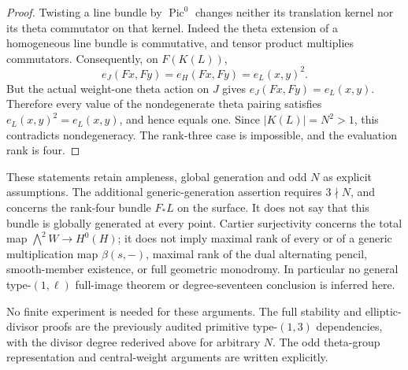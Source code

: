 \begin{proof}
Twisting a line bundle by \(\operatorname{Pic}^0\) changes
neither its translation kernel nor its theta commutator on that
kernel. Indeed the theta extension of a homogeneous line bundle
is commutative, and tensor product multiplies commutators.
Consequently, on \(F(K(L))\),
\[
             e_J(Fx,Fy)=e_H(Fx,Fy)=e_L(x,y)^2.
 \tag{DE-OE9}
\]
But the actual weight-one theta action on \(J\) gives
\(e_J(Fx,Fy)=e_L(x,y)\). Therefore every value of the
nondegenerate theta pairing satisfies \(e_L(x,y)^2=e_L(x,y)\),
and hence equals one. Since \(|K(L)|=N^2>1\), this
contradicts nondegeneracy. The rank-three case is impossible,
and the evaluation rank is four.
\end{proof}

\begin{remark}
\label{rem:DE-odd-Cartier-evaluation-scope}
These statements retain ampleness, global generation and odd
\(N\) as explicit assumptions. The additional generic-generation
assertion requires \(3\nmid N\), and concerns the rank-four
bundle \(F_*L\) on the surface. It does not say that this
bundle is globally generated at every point. Cartier surjectivity
concerns the total map \(\bigwedge^2W\to H^0(H)\); it does
not imply maximal rank of every or of a generic multiplication
map \(\beta(s,-)\), maximal rank of the dual alternating pencil,
smooth-member existence, or full geometric monodromy. In
particular no general type-\((1,\ell)\) full-image theorem or
degree-seventeen conclusion is inferred here.

No finite experiment is needed for these arguments. The full
stability and elliptic-divisor proofs are the previously audited
primitive type-\((1,3)\) dependencies, with the divisor degree
rederived above for arbitrary \(N\). The odd theta-group
representation and central-weight arguments are written explicitly.
\end{remark}
